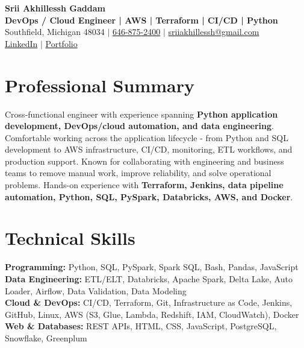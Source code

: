 \documentclass[letterpaper,10pt]{article}
\begin{document}
\fontsize{9.35pt}{10.45pt}\selectfont

\begin{center}
    {\LARGE \textbf{Srii Akhillessh Gaddam}} \\[-1pt]
    \textbf{DevOps / Cloud Engineer | AWS | Terraform | CI/CD | Python} \\[2pt]
    Southfield, Michigan 48034 $|$
    \href{tel:6468752400}{646-875-2400} $|$
    \href{mailto:sriiakhillessh@gmail.com}{sriiakhillessh@gmail.com} \\[1pt]
    \href{https://www.linkedin.com/in/srii-akhiilessh-gaddam-b48668191/}{LinkedIn} $|$
    \href{https://sriiakhillesshg.github.io/portfolio/}{Portfolio}
\end{center}
\vspace{-8pt}

\section{Professional Summary}
\small{Cross-functional engineer with experience spanning \textbf{Python application development, DevOps/cloud automation, and data engineering}. Comfortable working across the application lifecycle - from Python and SQL development to AWS infrastructure, CI/CD, monitoring, ETL workflows, and production support. Known for collaborating with engineering and business teams to remove manual work, improve reliability, and solve operational problems. Hands-on experience with \textbf{Terraform, Jenkins, data pipeline automation, Python, SQL, PySpark, Databricks, AWS, and Docker}.}

\section{Technical Skills}
\small{
\textbf{Programming:} Python, SQL, PySpark, Spark SQL, Bash, Pandas, JavaScript \\
\textbf{Data Engineering:} ETL/ELT, Databricks, Apache Spark, Delta Lake, Auto Loader, Airflow, Data Validation, Data Modeling \\
\textbf{Cloud \& DevOps:} CI/CD, Terraform, Git, Infrastructure as Code, Jenkins, GitHub, Linux, AWS (S3, Glue, Lambda, Redshift, IAM, CloudWatch), Docker \\
\textbf{Web \& Databases:} REST APIs, HTML, CSS, JavaScript, PostgreSQL, Snowflake, Greenplum
}
\end{document}
